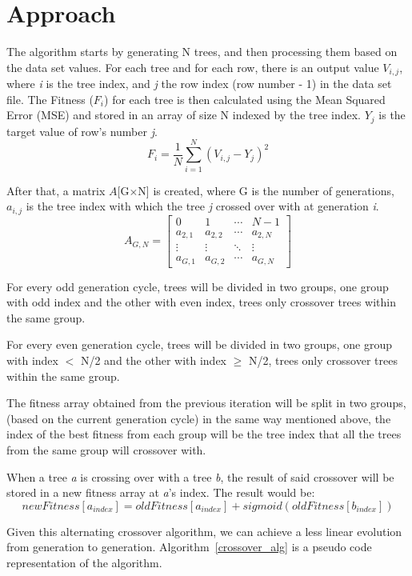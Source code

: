 \documentclass[runningheads]{llncs}
\begin{document}
\section{Approach}
The algorithm starts by generating N trees, and then processing them based on the data set values. For each tree and for each row, there is an output value $V_{i,j}$, where \textit{i} is the tree index, and \textit{j} the row index (row number - 1) in the data set file.
The Fitness ($F_i$) for each tree is then calculated using the Mean Squared Error (MSE) and stored in an array of size N indexed by the tree index. $Y_j$ is the target value of row's number \textit{j}. $$F_i = \frac{1}{N}\sum_{i=1}^{N} (V_{i,j} - Y_j)^{2}$$

After that, a matrix $A$[G$\times$N] is created, where G is the number of generations, $a_{i,j}$ is the tree index with which the tree \textit{j} crossed over with at generation \textit{i}.
\begin{equation*}
A_{G,N} = 
\begin{bmatrix}
0 & 1 & \cdots & N-1 \\
a_{2,1} & a_{2,2} & \cdots & a_{2,N} \\
\vdots  & \vdots  & \ddots & \vdots  \\
a_{G,1} & a_{G,2} & \cdots & a_{G,N} 
\end{bmatrix}
\end{equation*}

For every odd generation cycle, trees will be divided in two groups, one group with odd index and the other with even index, trees only crossover trees within the same group.

For every even generation cycle, trees will be divided in two groups, one group with index $<$ N/2 and the other with index $\geq$ N/2, trees only crossover trees within the same group.

The fitness array obtained from the previous iteration will be split in two groups, (based on the current generation cycle) in the same way mentioned above, the index of the best fitness from each group will be the tree index that all the trees from the same group will crossover with.

When a tree \textit{a} is crossing over with a tree \textit{b}, the result of said crossover will be stored in a new fitness array at \textit{a}'s index. The result would be:$$newFitness[a_{index}] = oldFitness[a_{index}] + sigmoid(oldFitness[b_{index}])$$

Given this alternating crossover algorithm, we can achieve a less linear evolution from generation to generation. Algorithm~\ref{crossover_alg} is a pseudo code representation of the algorithm.
\end{document}
